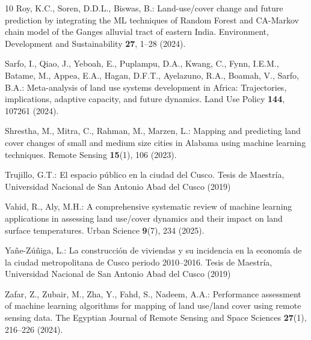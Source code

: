 \documentclass[runningheads]{llncs}
\begin{document}
\begin{thebibliography}{10}
Roy, K.C., Soren, D.D.L., Biswas, B.: Land-use/cover change and future
  prediction by integrating the ML techniques of Random Forest and CA-Markov
  chain model of the Ganges alluvial tract of eastern India. Environment,
  Development and Sustainability \textbf{27}, 1--28 (2024).

Sarfo, I., Qiao, J., Yeboah, E., Puplampu, D.A., Kwang, C., Fynn, I.E.M.,
  Batame, M., Appea, E.A., Hagan, D.F.T., Ayelazuno, R.A., Boamah, V., Sarfo,
  B.A.: Meta-analysis of land use systems development in Africa: Trajectories,
  implications, adaptive capacity, and future dynamics. Land Use Policy
  \textbf{144}, 107261 (2024). 

Shrestha, M., Mitra, C., Rahman, M., Marzen, L.: Mapping and predicting land
  cover changes of small and medium size cities in Alabama using machine
  learning techniques. Remote Sensing \textbf{15}(1), 106 (2023).

Trujillo, G.T.: El espacio p{\'u}blico en la ciudad del Cusco. Tesis de Maestr{\'i}a,
  Universidad Nacional de San Antonio Abad del Cusco (2019)

Vahid, R., Aly, M.H.: A comprehensive systematic review of machine learning
  applications in assessing land use/cover dynamics and their impact on land
  surface temperatures. Urban Science \textbf{9}(7), 234 (2025).

Ya{\~n}e-Z{\'u}{\~n}iga, L.: La construcci{\'o}n de viviendas y su incidencia en la
  econom{\'i}a de la ciudad metropolitana de Cusco periodo 2010--2016. Tesis de
  Maestr{\'i}a, Universidad Nacional de San Antonio Abad del Cusco (2019)

Zafar, Z., Zubair, M., Zha, Y., Fahd, S., Nadeem, A.A.: Performance assessment
  of machine learning algorithms for mapping of land use/land cover using
  remote sensing data. The Egyptian Journal of Remote Sensing and Space
  Sciences \textbf{27}(1), 216--226 (2024). 

\end{thebibliography}
\end{document}
